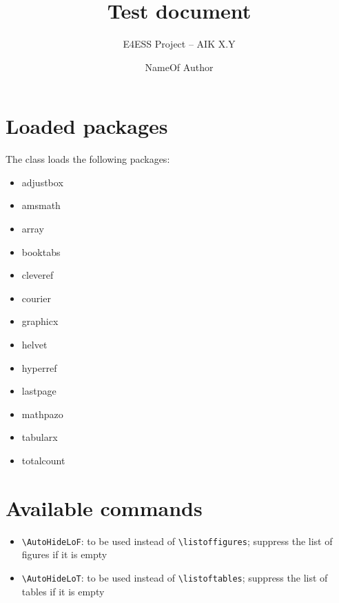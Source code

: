 \documentclass[a4paper,article]{e4esslayout}
\title{%
	Test document
}
\subtitle{%
	E4ESS Project -- AIK X.Y
}
\author{%
	NameOf Author
}
\begin{document}
\raggedbottom



\section{Loaded packages}
\label{sec:loa-pac}
The class loads the following packages:
\begin{itemize}
	\item adjustbox
	\item amsmath
	\item array
	\item booktabs
	\item cleveref
	\item courier
	\item graphicx
	\item helvet
	\item hyperref
	\item lastpage
	\item mathpazo
	\item tabularx
	\item totalcount
\end{itemize}

\section{Available commands}
\label{sec:ava-com}
\begin{itemize}
	\item \verb^\AutoHideLoF^: to be used instead of \verb^\listoffigures^; suppress the list of figures if it is empty
	\item \verb^\AutoHideLoT^: to be used instead of \verb^\listoftables^; suppress the list of tables if it is empty
\end{itemize}
\end{document}
